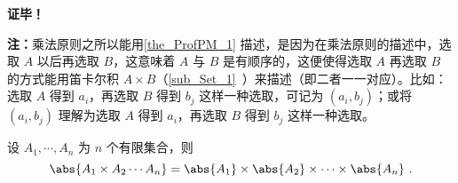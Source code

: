 \textbf{证毕！}

\textbf{注：}乘法原则之所以能用\autoref{the_ProfPM_1} 描述，是因为在乘法原则的描述中，选取 $A$ 以后再选取 $B$，这意味着 $A$ 与 $B$ 是有顺序的，这便使得选取 $A$ 再选取 $B$ 的方式能用笛卡尔积 $A\times B$（\autoref{sub_Set_1}~）来描述（即二者一一对应）。比如：选取 $A$ 得到 $a_i$，再选取 $B$ 得到 $b_j$ 这样一种选取，可记为 $(a_i,b_j)$；或将 $(a_i,b_j)$ 理解为选取 $A$ 得到 $a_i$，再选取 $B$ 得到 $b_j$ 这样一种选取。
\begin{corollary}{}
设 $A_1,\cdots,A_n$ 为 $n$ 个有限集合，则
\begin{equation}
\abs{A_1\times A_2\cdots A_n}=\abs{A_1}\times\abs{A_2}\times\cdots\times\abs{A_n}~.
\end{equation}

\end{corollary}
